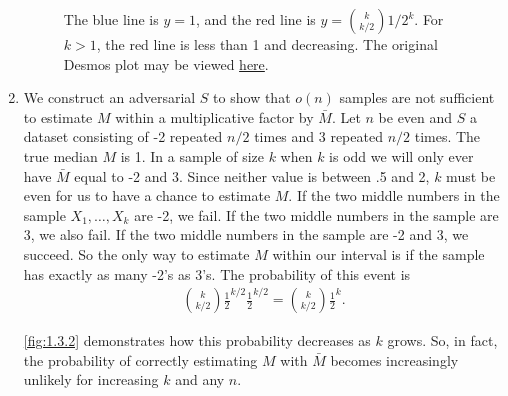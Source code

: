 \begin{enumerate}
    \begin{figure}[H]
        \centering
        \caption{The blue line is $y=1$, and the red line
        is $y = \binom{k}{k/2}1/2^k$.
        For $k>1$, the red line is less than 1 and decreasing.
        The original Desmos plot may be viewed 
        \href{https://www.desmos.com/calculator/zaeb2c8qvf}
        {here}.}
        \label{fig:1.3.2}
    \end{figure}
    
    \item We construct an adversarial $S$
    to show that $o(n)$ samples are not sufficient
    to estimate $M$ within a multiplicative factor
    by $\bar{M}$.
    Let $n$ be even and $S$ a dataset consisting of
    -2 repeated $n/2$ times and 3 repeated $n/2$ times.
    The true median $M$ is 1.
    In a sample of size $k$ when $k$ is odd
    we will only ever have $\bar{M}$ equal to -2 and 3.
    Since neither value is between .5 and 2,
    $k$ must be even for us to have a chance to estimate $M$.
    If the two middle numbers in the sample $X_1,\dots,X_k$
    are -2, we fail.
    If the two middle numbers in the sample are 3,
    we also fail.
    If the two middle numbers in the sample are -2 and 3,
    we succeed.
    So the only way to estimate $M$ within our interval
    is if the sample has exactly as many -2's as 3's.
    The probability of this event is
    \begin{align}
        \binom{k}{k/2} \frac{1}{2}^{k/2} \frac{1}{2}^{k/2}
        = \binom{k}{k/2} \frac{1}{2}^k.
    \nonumber 
    \end{align}
    
    \autoref{fig:1.3.2} demonstrates how this probability
    decreases as $k$ grows.
    So, in fact, the probability of correctly estimating
    $M$ with $\bar{M}$ becomes increasingly unlikely
    for increasing $k$ and any $n$.
    \qedsymbol
    
\end{enumerate}

